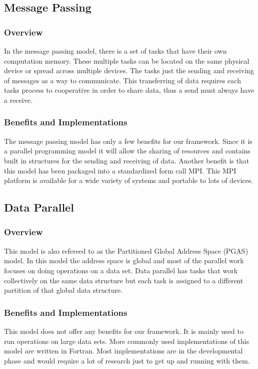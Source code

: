 \subsection{Message Passing}
\subsubsection{Overview}
In the message passing model, there is a set of tasks that have their own computation memory. These multiple tasks can be located on the same physical device or spread across multiple devices. The tasks just the sending and receiving of messages as a way to communicate. This transferring of data requires each tasks process to cooperative in order to share data, thus a send must always have a receive. \cite{PP}
\subsubsection{Benefits and Implementations}
The message passing model has only a few benefits for our framework. Since it is a parallel programming model it will allow the sharing of resources and contains built in structures for the sending and receiving of data. Another benefit is that this model has been packaged into a standardized form call MPI. This MPI platform is available for a wide variety of systems and portable to lots of devices. \cite{PP}

\subsection{Data Parallel}
\subsubsection{Overview}
This model is also refereed to as the Partitioned Global Address Space (PGAS) model.\cite{PP} In this model the address space is global and most of the parallel work focuses on doing operations on a data set. Data parallel has tasks that work collectively on the same data structure but each task is assigned to a different partition of that global data structure. \cite{PP}
\subsubsection{Benefits and Implementations}
This model does not offer any benefits for our framework. It is mainly used to run operations on large data sets. More commonly used implementations of this model are written in Fortran. Most implementations are in the developmental phase and would require a lot of research just to get up and running with them. \cite{PP}

